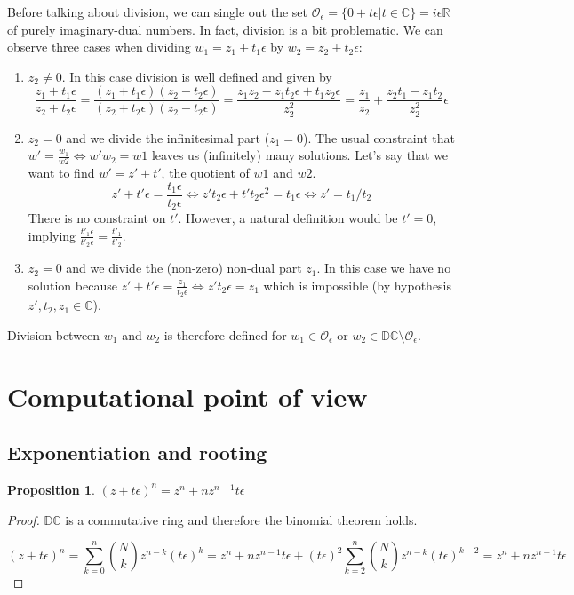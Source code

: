 \documentclass{article}
\newtheorem{proposition}[theorem]{Proposition}
\newcommand{\R}{\mathbb{R}}
\newcommand{\C}{\mathbb{C}}
\newcommand{\DC}{\mathbb{DC}}
\newcommand{\Z}{\mathcal{O}_\e}
\newcommand{\e}{\epsilon}
\begin{document}
Before talking about division, we can single out the set $\Z = \{0 + t \e | t \in \C\} = i\e \R$ of purely imaginary-dual numbers. In fact, division is a bit problematic. We can observe three cases when dividing $w_1 = z_1 + t_1 \e$ by $w_2 = z_2 + t_2 \e$:

\begin{enumerate}
        \item $z_2 \neq 0$. In this case division is well defined and given by
        \begin{equation}
        \frac{z_1 + t_1 \e}{z_2 + t_2 \e} = \frac{(z_1 + t_1 \e)(z_2 - t_2 \e)}{(z_2 + t_2 \e)(z_2 - t_2 \e)} = \frac{z_1 z_2 - z_1 t_2 \e + t_1 z_2 \e}{z_2^2} = \frac{z_1}{z_2} + \frac{z_2 t_1 - z_1 t_2 }{z_2^2} \e
        \end{equation}
        \item $z_2 = 0$ and we divide the infinitesimal part ($z_1 = 0$). The usual constraint that $w' = \frac{w_1}{w2} \iff w'w_2 = w1$ leaves us (infinitely) many solutions. Let's say that we want to find $w' = z' + t'$, the quotient of $w1$ and $w2$.
        \begin{equation}
        z' + t' \e = \frac{t_1 \e}{t_2 \e} \iff z' t_2 \e + t' t_2 \e^2 = t_1 \e \iff z' = t_1/t_2
        \end{equation}
        There is no constraint on $t'$. However, a natural definition would be $t' = 0$, implying $\frac{t'_1 \e}{t'_2 \e} = \frac{t'_1}{t'_2}$.
        \item $z_2 = 0$ and we divide the (non-zero) non-dual part $z_1$. In this case we have no solution because $z' + t'\e = \frac{z_1}{t_2 \e} \iff z' t_2 \e = z_1$ which is impossible (by hypothesis $z', t_2, z_1 \in \C$).
\end{enumerate}

Division between $w_1$ and $w_2$ is therefore defined for $w_1 \in \Z$ or $w_2 \in \DC \setminus \Z$.

\section{Computational point of view}
\subsection{Exponentiation and rooting}

\begin{proposition}
$(z + t\e)^n = z^n + n z^{n-1} t \e$
\end{proposition}
\begin{proof}
$\DC$ is a commutative ring and therefore the binomial theorem holds.

\noindent \begin{equation}
(z + t\e)^n = \sum_{k=0}^n \binom{N}{k} z^{n-k}(t\e)^k = z^n + nz^{n-1}t\e + (t\e)^2 \sum_{k=2}^n \binom{N}{k} z^{n-k}(t\e)^{k-2} = z^n + nz^{n-1}t\e
\end{equation}
\end{proof}
\end{document}
